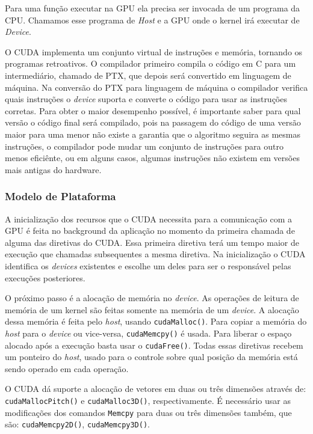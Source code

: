 Para uma função executar na GPU ela precisa ser invocada de um programa da CPU. Chamamos esse programa de \textit{Host}
e a GPU onde o kernel irá executar de \textit{Device}.

O CUDA implementa um conjunto virtual de instruções e memória, tornando os programas retroativos. O compilador
primeiro compila o código em C para um intermediário, chamado de PTX, que depois será convertido em linguagem
de máquina. Na conversão do PTX para linguagem de máquina o compilador verifica quais instruções o \textit{device}
suporta e converte o código para usar as instruções corretas.
Para obter o maior desempenho possível, é importante saber para qual versão o código final será compilado, 
pois na passagem do código de uma versão maior para uma menor não existe a garantia que o algoritmo seguira as mesmas instruções, 
o compilador pode mudar um conjunto de instruções para outro menos eficiênte, ou em alguns casos, algumas instruções não existem em
versões mais antigas do hardware.

\subsubsection{Modelo de Plataforma}
A inicialização dos recursos que o CUDA necessita para a comunicação com a GPU é feita no background da
aplicação no momento da primeira chamada de alguma das diretivas do CUDA. Essa primeira diretiva terá um
tempo maior de execução que chamadas subsequentes a mesma diretiva. Na inicialização o CUDA identifica
os \textit{devices} existentes e escolhe um deles para ser o responsável pelas execuções posteriores.

O próximo passo é a alocação de memória no \textit{device}. As operações de leitura de memória de um kernel são feitas somente
na memória de um \textit{device}. A alocação dessa memória é feita pelo \textit{host}, usando \verb#cudaMalloc()#. 
Para copiar a memória do \textit{host} para o \textit{device} ou vice-versa,
\verb#cudaMemcpy()# é usada. Para liberar o espaço alocado após a execução basta usar o \verb#cudaFree()#.
Todas essas diretivas recebem um ponteiro do \textit{host}, usado para o controle sobre qual posição da memória está sendo
operado em cada operação.

O CUDA dá suporte a alocação de vetores em duas ou três dimensões através de: \verb#cudaMallocPitch()# e 
\verb#cudaMalloc3D()#, respectivamente. É necessário usar as modificações dos comandos \verb#Memcpy# para
duas ou três dimensões também, que são: \verb#cudaMemcpy2D()#, \verb#cudaMemcpy3D()#.

